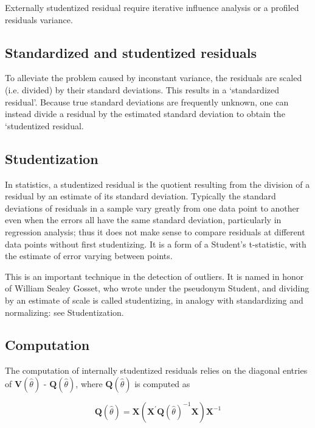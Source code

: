 \documentclass[12pt, a4paper]{report}
\theoremstyle{plain}
\theoremstyle{definition}
\theoremstyle{remark}
\begin{document}
Externally  studentized residual require iterative influence analysis or a profiled residuals variance.

\subsection{Standardized and studentized residuals} %

To alleviate the problem caused by inconstant variance, the residuals are scaled (i.e. divided) by their standard deviations. This results in a `standardized residual'. Because true standard deviations are frequently unknown, one can instead divide a residual by the estimated standard deviation to obtain the `studentized residual. 


\subsection{Studentization}
In statistics, a studentized residual is the quotient resulting from the division of a residual by an estimate of its standard deviation. Typically the standard deviations of residuals in a sample vary greatly from one data point to another even when the errors all have the same standard deviation, particularly in regression analysis; thus it does not make sense to compare residuals at different data points without first studentizing. It is a form of a Student's t-statistic, with the estimate of error varying between points.

This is an important technique in the detection of outliers. It is named in honor of William Sealey Gosset, who wrote under the pseudonym Student, and dividing by an estimate of scale is called studentizing, in analogy with standardizing and normalizing: see Studentization.

\subsection{Computation}%

The computation of internally studentized residuals relies on the diagonal entries of $\boldsymbol{V} (\hat{\theta})$ - $\boldsymbol{Q} (\hat{\theta})$, where $\boldsymbol{Q} (\hat{\theta})$ is computed as

\[ \boldsymbol{Q} (\hat{\theta}) = \boldsymbol{X} ( \boldsymbol{X}^{\prime}\boldsymbol{Q} (\hat{\theta})^{-1}\boldsymbol{X})\boldsymbol{X}^{-1} \]
\end{document}

